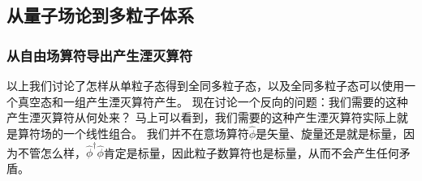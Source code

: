 \documentclass[hyperref, UTF8, a4paper]{ctexart}
\begin{document}

\subsection{从量子场论到多粒子体系}\label{sec:from-qft-to-many-body}


\subsubsection{从自由场算符导出产生湮灭算符}

以上我们讨论了怎样从单粒子态得到全同多粒子态，以及全同多粒子态可以使用一个真空态和一组产生湮灭算符产生。
现在讨论一个反向的问题：我们需要的这种产生湮灭算符从何处来？
马上可以看到，我们需要的这种产生湮灭算符实际上就是算符场的一个线性组合。
我们并不在意场算符$\hat{\phi}$是矢量、旋量还是就是标量，因为不管怎么样，$\hat{\phi}^\dagger \hat{\phi}$肯定是标量，因此粒子数算符也是标量，从而不会产生任何矛盾。
\end{document}
